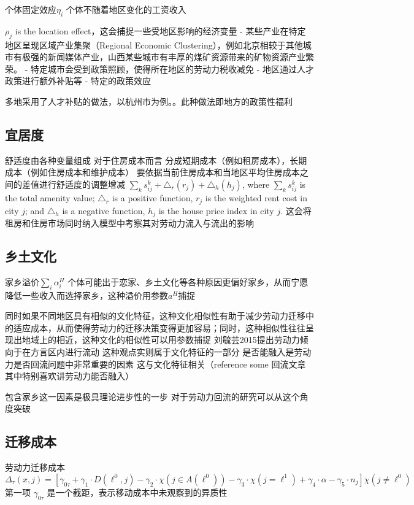 \documentclass[a4paper,10pt]{article}
\begin{document}
个体固定效应$\eta_i$
个体不随着地区变化的工资收入



$\rho_j$ is the location effect，这会捕捉一些受地区影响的经济变量
- 某些产业在特定地区呈现区域产业集聚（Regional Economic Clustering），例如北京相较于其他城市有极强的新闻媒体产业，山西某些城市有丰厚的煤矿资源带来的矿物资源产业繁荣。
- 特定城市会受到政策照顾，使得所在地区的劳动力税收减免
- 地区通过人才政策进行额外补贴等
- 特定的政策效应

多地采用了人才补贴的做法，以杭州市为例。。此种做法即地方的政策性福利

\subsection{宜居度}
舒适度由各种变量组成
对于住房成本而言
分成短期成本（例如租房成本），长期成本（例如住房成本和维护成本）
要依据当前住房成本和当地区平均住房成本之间的差值进行舒适度的调整增减
$\sum\limits_{k}s^k_{ij}+\triangle_r(r_j)+\triangle_h(h_j)$, where $\sum\limits_{k}s^k_{ij}$ is the total amenity value; $\triangle_r$ is a positive function, $r_j$ is the weighted rent cost in city $j$; and $\triangle_h$ is a negative function, $h_j$ is the house price index in city $j$.
这会将租房和住房市场同时纳入模型中考察其对劳动力流入与流出的影响


\subsection{乡土文化}
家乡溢价$\sum\limits_{i}\alpha^{H}_{i}$
个体可能出于恋家、乡土文化等各种原因更偏好家乡，从而宁愿降低一些收入而选择家乡，这种溢价用参数$a^H$捕捉

同时如果不同地区具有相似的文化特征，这种文化相似性有助于减少劳动力迁移中的适应成本，从而使得劳动力的迁移决策变得更加容易；同时，这种相似性往往呈现出地域上的相近，这种文化的相似性可以用参数捕捉
刘毓芸2015提出劳动力倾向于在方言区内进行流动 这种观点实则属于文化特征的一部分
是否能融入是劳动力是否回流问题中非常重要的因素 这与文化特征相关（reference some 回流文章 其中特别喜欢讲劳动力能否融入）

包含家乡这一因素是极具理论进步性的一步 对于劳动力回流的研究可以从这个角度突破

\subsection{迁移成本}
劳动力迁移成本
$$\Delta_\tau(x, j) = [\gamma_{0 \tau}+\gamma_1 \cdot D(\ell^0,j)-\gamma_2 \cdot\chi(j\in A(\ell^0))-\gamma_3 \cdot\chi(j=\ell^1)+\gamma_4 \cdot\alpha-\gamma_5 \cdot n_j]\chi(j\neq \ell^0)$$
第一项 $\gamma_{0 \tau}$ 是一个截距，表示移动成本中未观察到的异质性
\end{document}
